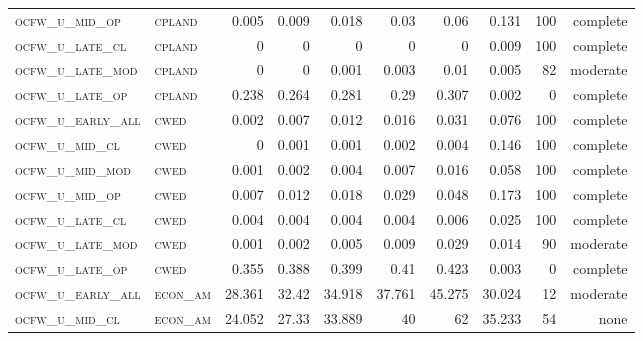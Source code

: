\begin{landscape}
\begin{center}
\begin{footnotesize}
\begin{longtable}{llrrrrr|rrr}
\textsc{ocfw\_u\_mid\_op   } & \textsc{cpland    }    & 0.005    & 0.009    & 0.018    & 0.03     & 0.06      & 0.131         & 100           & complete            \\
\textsc{ocfw\_u\_late\_cl  } & \textsc{cpland    }    & 0        & 0        & 0        & 0        & 0         & 0.009         & 100           & complete            \\
\textsc{ocfw\_u\_late\_mod } & \textsc{cpland    }    & 0        & 0        & 0.001    & 0.003    & 0.01      & 0.005         & 82            & moderate       \\
\textsc{ocfw\_u\_late\_op  } & \textsc{cpland    }    & 0.238    & 0.264    & 0.281    & 0.29     & 0.307     & 0.002         & 0             & complete           \\
\textsc{ocfw\_u\_early\_all} & \textsc{cwed      }    & 0.002    & 0.007    & 0.012    & 0.016    & 0.031     & 0.076         & 100           & complete            \\
\textsc{ocfw\_u\_mid\_cl   } & \textsc{cwed      }    & 0        & 0.001    & 0.001    & 0.002    & 0.004     & 0.146         & 100           & complete            \\
\textsc{ocfw\_u\_mid\_mod  } & \textsc{cwed      }    & 0.001    & 0.002    & 0.004    & 0.007    & 0.016     & 0.058         & 100           & complete            \\
\textsc{ocfw\_u\_mid\_op   } & \textsc{cwed      }    & 0.007    & 0.012    & 0.018    & 0.029    & 0.048     & 0.173         & 100           & complete            \\
\textsc{ocfw\_u\_late\_cl  } & \textsc{cwed      }    & 0.004    & 0.004    & 0.004    & 0.004    & 0.006     & 0.025         & 100           & complete            \\
\textsc{ocfw\_u\_late\_mod } & \textsc{cwed      }    & 0.001    & 0.002    & 0.005    & 0.009    & 0.029     & 0.014         & 90            & moderate       \\
\textsc{ocfw\_u\_late\_op  } & \textsc{cwed      }    & 0.355    & 0.388    & 0.399    & 0.41     & 0.423     & 0.003         & 0             & complete           \\
\textsc{ocfw\_u\_early\_all} & \textsc{econ\_am  }    & 28.361   & 32.42    & 34.918   & 37.761   & 45.275    & 30.024        & 12            & moderate       \\
\textsc{ocfw\_u\_mid\_cl   } & \textsc{econ\_am  }    & 24.052   & 27.33    & 33.889   & 40       & 62        & 35.233        & 54            & none       \\

\end{longtable}
\end{footnotesize}
\end{center}
\end{landscape}
